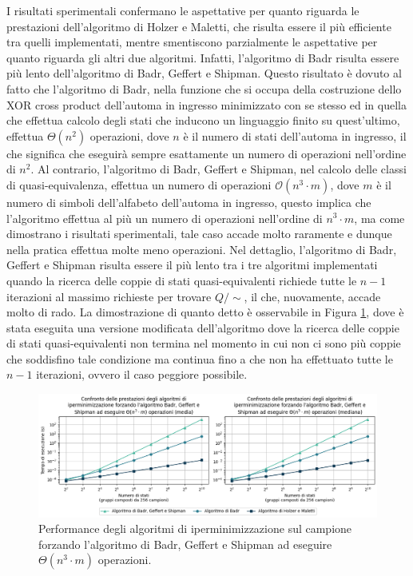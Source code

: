 \documentclass[a4paper,12pt]{report} %
\newcommand{\partitioned}[2]{#1\slash\!\!#2}  %
\newcommand{\bigo}[0]{\mathcal{O}}            %
\begin{document}
I risultati sperimentali confermano le aspettative per quanto riguarda le prestazioni dell'algoritmo di Holzer e Maletti,
che risulta essere il più efficiente tra quelli implementati, mentre smentiscono
parzialmente le aspettative per quanto riguarda gli altri due algoritmi. Infatti, l'algoritmo di Badr risulta
essere più lento dell'algoritmo di Badr, Geffert e Shipman. Questo risultato è dovuto al fatto che 
l'algoritmo di Badr, nella funzione che si occupa della costruzione dello XOR cross product dell'automa in
ingresso minimizzato con se stesso ed in quella che effettua calcolo degli stati che inducono un linguaggio
finito su quest'ultimo, effettua $\Theta(n^2)$ operazioni, dove $n$ è il numero di stati dell'automa in ingresso, il che significa che eseguirà sempre esattamente 
un numero di operazioni nell'ordine di $n^2$. Al contrario, l'algoritmo di Badr, Geffert e Shipman, nel calcolo delle classi di
quasi-equivalenza, effettua un numero di operazioni $\bigo(n^3 \cdot m)$, dove $m$ è il
numero di simboli dell'alfabeto dell'automa in ingresso, questo implica che l'algoritmo effettua al più
un numero di operazioni nell'ordine di $n^3 \cdot m$, ma come dimostrano i risultati sperimentali, tale caso
accade molto raramente e dunque nella pratica effettua molte meno operazioni.
Nel dettaglio, l'algoritmo di Badr, Geffert e Shipman risulta essere il più lento tra i tre algoritmi implementati
quando la ricerca delle coppie di stati quasi-equivalenti richiede tutte le $n-1$ iterazioni al massimo richieste
per trovare $\partitioned{Q}{\sim}$, il che, nuovamente, accade molto di rado. La dimostrazione di quanto detto è
osservabile in Figura \ref{fig:dfa-pcomparison-all-forced-lines}, dove è stata eseguita una versione modificata dell'algoritmo 
dove la ricerca delle coppie di stati quasi-equivalenti non termina nel momento in cui non ci sono più coppie
che soddisfino tale condizione ma continua fino a che non ha effettuato tutte le $n-1$ iterazioni, ovvero il caso
peggiore possibile.

\begin{figure}[!htb]
  \centering
  \includegraphics[width=1\linewidth]{images/performance_forced_all_line.png}
  \caption{\label{fig:dfa-pcomparison-all-forced-lines}Performance degli algoritmi di iperminimizzazione sul
  campione forzando l'algoritmo di Badr, Geffert e Shipman ad eseguire $\Theta(n^3 \cdot m)$ operazioni.}
\end{figure}
\end{document}
